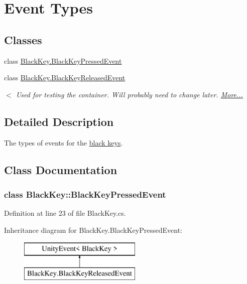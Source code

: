 \hypertarget{group___black_key_event_types}{}\section{Event Types}
\label{group___black_key_event_types}
\subsection*{Classes}
\begin{DoxyCompactItemize}
\item 
class \hyperlink{group___black_key_event_types_class_black_key_1_1_black_key_pressed_event}{Black\+Key.\+Black\+Key\+Pressed\+Event}
\item 
class \hyperlink{group___black_key_event_types_class_black_key_1_1_black_key_released_event}{Black\+Key.\+Black\+Key\+Released\+Event}
\begin{DoxyCompactList}\small\item\em $<$ Used for testing the container. Will probably need to change later.  \hyperlink{group___black_key_event_types_class_black_key_1_1_black_key_released_event}{More...}\end{DoxyCompactList}\end{DoxyCompactItemize}


\subsection{Detailed Description}
The types of events for the \hyperlink{group___doc_black_key}{black keys}. 

\subsection{Class Documentation}
\label{class_black_key_1_1_black_key_pressed_event}
\subsubsection{class Black\+Key\+:\+:Black\+Key\+Pressed\+Event}


Definition at line 23 of file Black\+Key.\+cs.

Inheritance diagram for Black\+Key.\+Black\+Key\+Pressed\+Event\+:\begin{figure}[H]
\begin{center}
\leavevmode
\includegraphics[height=2.000000cm]{group___black_key_event_types}
\end{center}
\end{figure}
\label{class_black_key_1_1_black_key_released_event}
